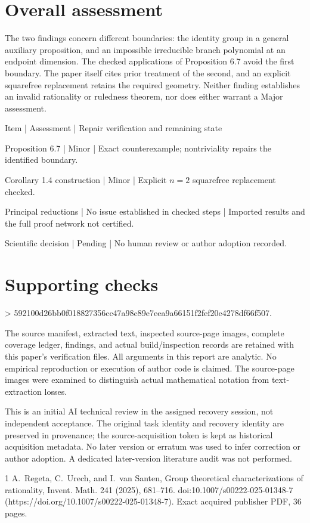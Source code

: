 \documentclass[10pt]{article}
\begin{document}
\section*{Overall assessment}
The two findings concern different boundaries: the identity group in a general auxiliary proposition, and an impossible irreducible branch polynomial at an endpoint dimension. The checked applications of Proposition 6.7 avoid the first boundary. The paper itself cites prior treatment of the second, and an explicit squarefree replacement retains the required geometry. Neither finding establishes an invalid rationality or ruledness theorem, nor does either warrant a Major assessment.\par
Item | Assessment | Repair verification and remaining state\par
Proposition 6.7 | Minor | Exact counterexample; nontriviality repairs the identified boundary.\par
Corollary 1.4 construction | Minor | Explicit \(n=2\) squarefree replacement checked.\par
Principal reductions | No issue established in checked steps | Imported results and the full proof network not certified.\par
Scientific decision | Pending | No human review or author adoption recorded.\par
\section*{Supporting checks}
> 592100d26bb0f018827356cc47a98c89e7eea9a66151f2fef20e4278df66f507.\par
The source manifest, extracted text, inspected source-page images, complete coverage ledger, findings, and actual build/inspection records are retained with this paper’s verification files. All arguments in this report are analytic. No empirical reproduction or execution of author code is claimed. The source-page images were examined to distinguish actual mathematical notation from text-extraction losses.\par
This is an initial AI technical review in the assigned recovery session, not independent acceptance. The original task identity and recovery identity are preserved in provenance; the source-acquisition token is kept as historical acquisition metadata. No later version or erratum was used to infer correction or author adoption. A dedicated later-version literature audit was not performed.\par
1 A. Regeta, C. Urech, and I. van Santen, Group theoretical characterizations of rationality, Invent. Math. 241 (2025), 681–716. doi:10.1007/s00222-025-01348-7 (https://doi.org/10.1007/s00222-025-01348-7). Exact acquired publisher PDF, 36 pages.\par
\end{document}

